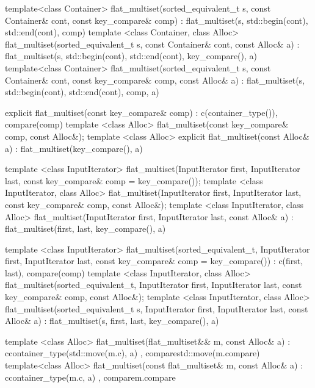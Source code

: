 \begin{codeblock}
\begin{codeblock}
\begin{codeblock}
\begin{addedblock}
\begin{codeblock}
{    template<class Container>
    flat_multiset(sorted_equivalent_t s, const Container& cont, const key_compare& comp)
        : flat_multiset(s, std::begin(cont), std::end(cont), comp) { }
    template <class Container, class Alloc>
      flat_multiset(sorted_equivalent_t s, const Container& cont, const Alloc& a)
        : flat_multiset(s, std::begin(cont), std::end(cont), key_compare(), a) { }
    template<class Container>
    flat_multiset(sorted_equivalent_t s, const Container& cont, const key_compare& comp, const Alloc& a)
        : flat_multiset(s, std::begin(cont), std::end(cont), comp, a) { }

    explicit flat_multiset(const key_compare& comp)
      : c(container_type()), compare(comp) { }
    template <class Alloc>
      flat_multiset(const key_compare& comp, const Alloc&);
    template <class Alloc>
      explicit flat_multiset(const Alloc& a)
        : flat_multiset(key_compare(), a) { }

    template <class InputIterator>
      flat_multiset(InputIterator first, InputIterator last,
                    const key_compare& comp = key_compare());
    template <class InputIterator, class Alloc>
      flat_multiset(InputIterator first, InputIterator last,
                    const key_compare& comp, const Alloc&);
    template <class InputIterator, class Alloc>
      flat_multiset(InputIterator first, InputIterator last,
                    const Alloc& a)
        : flat_multiset(first, last, key_compare(), a) { }

    template <class InputIterator>
      flat_multiset(sorted_equivalent_t, InputIterator first, InputIterator last,
                    const key_compare& comp = key_compare())
        : c(first, last), compare(comp) { }
    template <class InputIterator, class Alloc>
      flat_multiset(sorted_equivalent_t, InputIterator first, InputIterator last,
                    const key_compare& comp, const Alloc&);
    template <class InputIterator, class Alloc>
      flat_multiset(sorted_equivalent_t s, InputIterator first, InputIterator last,
                    const Alloc& a)
        : flat_multiset(s, first, last, key_compare(), a) { }

    template <class Alloc>
     flat_multiset(flat_multiset&& m, const Alloc& a)
       : c{container_type(std::move(m.c), a)}
       , compare{std::move(m.compare)}
     { }
   template<class Alloc>
     flat_multiset(const flat_multiset& m, const Alloc& a)
       : c{container_type(m.c, a)}
       , compare{m.compare}
     { }

}
\end{codeblock}
\end{addedblock}
\end{codeblock}
\end{codeblock}
\end{codeblock}
